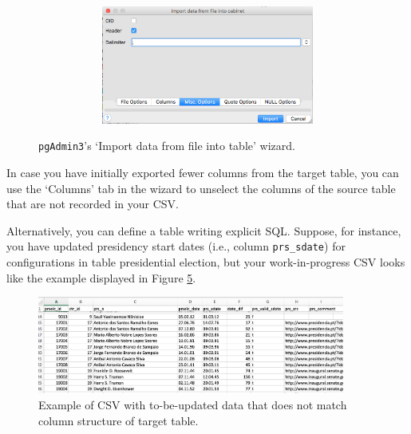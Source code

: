 \begin{figure}[ht!]
\begin{subfigure}{.40\textwidth}
\begin{subfigure}{1\linewidth}
      \label{fig_pgadmin3_import_data_wizard_file_options}
    \end{subfigure}
    ~\\%
    \begin{subfigure}{1\linewidth}
    \includegraphics[width=\textwidth,trim= 0 0 0 0, clip]{pcdb_documentation_screenshots/pgadmin3_import_data_wizard_misc_options.png}
      \label{fig_pgadmin3_import_data_wizard_misc_options}
    \end{subfigure}
  \end{subfigure}
\caption{\texttt{pgAdmin3}'s `Import data from file into table' wizard.}
\end{figure}

In case you have initially exported fewer columns from the target table, you can use the `Columns' tab in the wizard to unselect the columns of the source table that are not recorded in your CSV.

Alternatively, you can define a table writing explicit SQL. 
Suppose, for instance, you have updated presidency start dates (i.e., column \texttt{prs\_sdate}) for configurations in table presidential election, but your work-in-progress CSV looks like the example displayed in Figure \ref{fig_excel_update_prs_sdate_csv}.

\begin{figure}[ht!]
  \centering
  \includegraphics[width=0.9\textwidth,trim= 0 0 0 0, clip]{pcdb_documentation_screenshots/excel_update_prs_sdate_csv.png}
  \caption{Example of CSV with to-be-updated data that does not match column structure of target table.}
  \label{fig_excel_update_prs_sdate_csv}
\end{figure}

